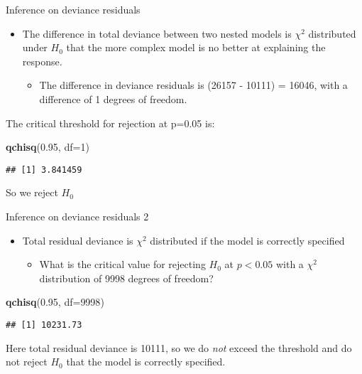 \documentclass[ignorenonframetext,]{beamer}
\newenvironment{Shaded}{\begin{snugshade}}{\end{snugshade}}
\newcommand{\KeywordTok}[1]{\textcolor[rgb]{0.13,0.29,0.53}{\textbf{#1}}}
\newcommand{\DataTypeTok}[1]{\textcolor[rgb]{0.13,0.29,0.53}{#1}}
\newcommand{\DecValTok}[1]{\textcolor[rgb]{0.00,0.00,0.81}{#1}}
\newcommand{\FloatTok}[1]{\textcolor[rgb]{0.00,0.00,0.81}{#1}}
\newcommand{\NormalTok}[1]{#1}
\providecommand{\tightlist}{%
  \setlength{\itemsep}{0pt}\setlength{\parskip}{0pt}}
\begin{document}
\begin{frame}[fragile]{Inference on deviance residuals}

\begin{itemize}
\tightlist
\item
  The difference in total deviance between two nested models is
  \(\chi^2\) distributed under \(H_0\) that the more complex model is no
  better at explaining the response.

  \begin{itemize}
  \tightlist
  \item
    The difference in deviance residuals is (26157 - 10111) = 16046,
    with a difference of 1 degrees of freedom.
  \end{itemize}
\end{itemize}

The critical threshold for rejection at p=0.05 is:

\begin{Shaded}
\begin{Highlighting}[]
\KeywordTok{qchisq}\NormalTok{(}\FloatTok{0.95}\NormalTok{, }\DataTypeTok{df=}\DecValTok{1}\NormalTok{)}
\end{Highlighting}
\end{Shaded}

\begin{verbatim}
## [1] 3.841459
\end{verbatim}

So we reject \(H_0\)

\end{frame}

\begin{frame}[fragile]{Inference on deviance residuals 2}

\begin{itemize}
\tightlist
\item
  Total residual deviance is \(\chi^2\) distributed if the model is
  correctly specified

  \begin{itemize}
  \tightlist
  \item
    What is the critical value for rejecting \(H_0\) at \(p < 0.05\)
    with a \(\chi^2\) distribution of 9998 degrees of freedom?
  \end{itemize}
\end{itemize}

\begin{Shaded}
\begin{Highlighting}[]
\KeywordTok{qchisq}\NormalTok{(}\FloatTok{0.95}\NormalTok{, }\DataTypeTok{df=}\DecValTok{9998}\NormalTok{)}
\end{Highlighting}
\end{Shaded}

\begin{verbatim}
## [1] 10231.73
\end{verbatim}

Here total residual deviance is 10111, so we do \emph{not} exceed the
threshold and do not reject \(H_0\) that the model is correctly
specified.

\end{frame}
\end{document}
